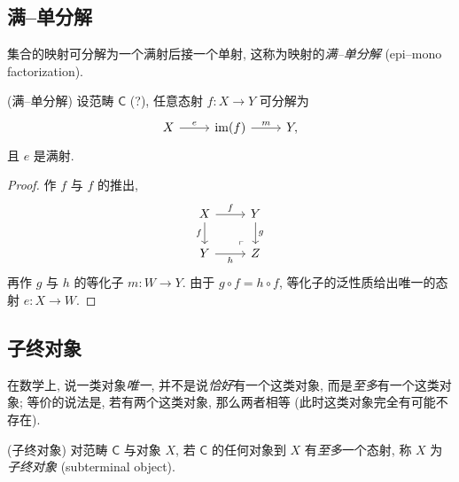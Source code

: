 
\subsection{满--单分解}

集合的映射可分解为一个满射后接一个单射, 这称为映射的\emph{满--单分解} (epi--mono factorization). %

\begin{prop}
    {(满--单分解)}
    设范畴 $\mathsf C$ (?), 任意态射 $f\colon X \to Y$ 可分解为 %
\[\begin{tikzcd}[ampersand replacement=\&]
	X \& {\operatorname{im}(f)} \& Y,
	\arrow["e", from=1-1, to=1-2]
	\arrow["m", from=1-2, to=1-3]
\end{tikzcd}\]
    且 $e$ 是满射.
\end{prop}

\begin{proof}
    作 $f$ 与 $f$ 的推出,
\[\begin{tikzcd}[ampersand replacement=\&]
	X \& Y \\
	Y \& Z
	\arrow["f"', from=1-1, to=2-1]
	\arrow["h"', from=2-1, to=2-2]
	\arrow["f", from=1-1, to=1-2]
	\arrow["g", from=1-2, to=2-2]
	\arrow["\lrcorner"{anchor=center, pos=0.125, rotate=180}, draw=none, from=2-2, to=1-1]
\end{tikzcd}\]
    再作 $g$ 与 $h$ 的等化子 $m \colon W \to Y$.
    由于 $g\circ f = h\circ f$, 等化子的泛性质给出唯一的态射 $e \colon X \to W$.
\end{proof}

\subsection{子终对象}

在数学上, 说一类对象\emph{唯一}, 并不是说\emph{恰好}有一个这类对象, 而是\emph{至多}有一个这类对象; 等价的说法是, 若有两个这类对象, 那么两者相等 (此时这类对象完全有可能不存在).

\begin{definition}
	[label={subterminal-object-definition}]
	{(子终对象)}
	对范畴 $\mathsf C$ 与对象 $X$, 若 $\mathsf C$ 的任何对象到 $X$ 有\emph{至多}一个态射, 称 $X$ 为\emph{子终对象} (subterminal object).
\end{definition}


